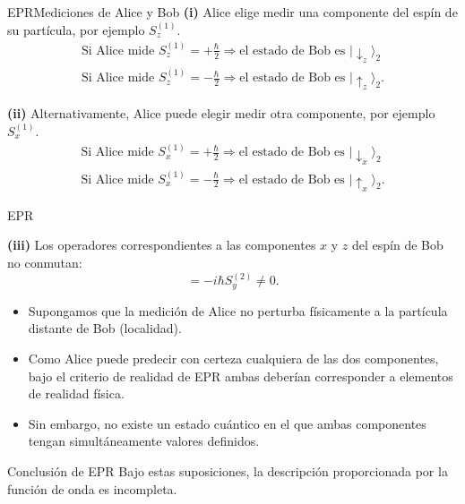 \begin{frame}{EPR}{Mediciones de Alice y Bob}
\textbf{(i)} Alice elige medir una componente del espín de su partícula, por ejemplo $S_z^{(1)}$.
\begin{gather*}
	\text{Si Alice mide } S_z^{(1)} = +\frac{\hbar}{2} \Rightarrow \text{el estado de Bob es } |\downarrow_z\rangle_2
	\\
	\text{Si Alice mide } S_z^{(1)} = -\frac{\hbar}{2} \Rightarrow \text{el estado de Bob es } |\uparrow_z\rangle_2.
\end{gather*}\vspace{2mm}

\textbf{(ii)} Alternativamente, Alice puede elegir medir otra componente, por ejemplo $S_x^{(1)}$.
\begin{gather*}
	\text{Si Alice mide } S_x^{(1)} = +\frac{\hbar}{2} \Rightarrow \text{el estado de Bob es } |\downarrow_x\rangle_2
	\\
	\text{Si Alice mide } S_x^{(1)} = -\frac{\hbar}{2} \Rightarrow \text{el estado de Bob es } |\uparrow_x\rangle_2.
\end{gather*}	
\end{frame}



\begin{frame}{EPR}{}
	
	\textbf{(iii)} Los operadores correspondientes a las componentes $x$ y $z$ del espín de Bob no conmutan:
	\begin{equation}
		[S_x^{(2)},S_z^{(2)}] = -i\hbar S_y^{(2)} \neq 0.
		\label{eq:contradiccion}
	\end{equation}
	
	\begin{itemize}
		\item Supongamos que la medición de Alice no perturba físicamente a la partícula distante de Bob (localidad).
		\item Como Alice puede predecir con certeza cualquiera de las dos componentes, bajo el criterio de realidad de EPR ambas deberían corresponder a elementos de realidad física.
		\item Sin embargo, no existe un estado cuántico en el que ambas componentes tengan simultáneamente valores definidos.
	\end{itemize}
	
	\begin{block}{Conclusión de EPR}
		Bajo estas suposiciones, la descripción proporcionada por la función de onda es incompleta.
	\end{block}
	
\end{frame}


